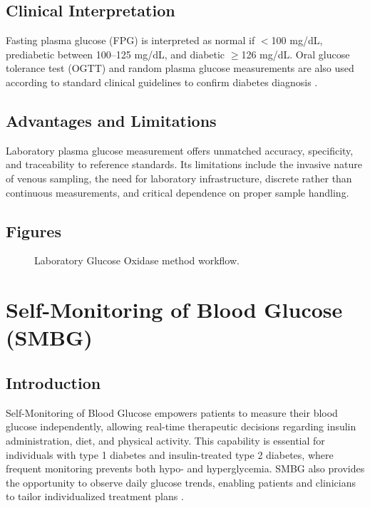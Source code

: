 \documentclass[12pt,a4paper]{article}
\begin{document}
\subsection{Clinical Interpretation}
Fasting plasma glucose (FPG) is interpreted as normal if $<$100 mg/dL, prediabetic between 100–125 mg/dL, and diabetic $\geq$126 mg/dL. Oral glucose tolerance test (OGTT) and random plasma glucose measurements are also used according to standard clinical guidelines to confirm diabetes diagnosis \cite{StatPearls2025}.

\subsection{Advantages and Limitations}
Laboratory plasma glucose measurement offers unmatched accuracy, specificity, and traceability to reference standards. Its limitations include the invasive nature of venous sampling, the need for laboratory infrastructure, discrete rather than continuous measurements, and critical dependence on proper sample handling.

\subsection{Figures}
\begin{figure}[h!]
\centering
{}
\caption{Laboratory Glucose Oxidase method workflow.}
\label{fig:glucoseoxidase}
\end{figure}

\section{Self-Monitoring of Blood Glucose (SMBG)}

\subsection{Introduction}
Self-Monitoring of Blood Glucose empowers patients to measure their blood glucose independently, allowing real-time therapeutic decisions regarding insulin administration, diet, and physical activity. This capability is essential for individuals with type 1 diabetes and insulin-treated type 2 diabetes, where frequent monitoring prevents both hypo- and hyperglycemia. SMBG also provides the opportunity to observe daily glucose trends, enabling patients and clinicians to tailor individualized treatment plans \cite{Bergenstal2017, ADA2025}.
\end{document}
